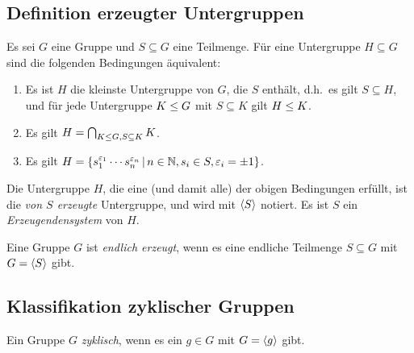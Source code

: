 \subsection{Definition erzeugter Untergruppen}

Es sei $G$ eine Gruppe und $S \subseteq G$ eine Teilmenge.
Für eine Untergruppe $H \subseteq G$ sind die folgenden Bedingungen äquivalent:

\begin{enumerate}
  \item
    Es ist $H$ die kleinste Untergruppe von $G$, die $S$ enthält, d.h.\ es gilt $S \subseteq H$, und für jede Untergruppe $K \mathrel{\leq} G$ mit $S \subseteq K$ gilt $H \mathrel{\leq} K$.
  \item
    Es gilt $H = \bigcap_{K \mathrel{\leq} G, S \subseteq K} K$.
  \item
    Es gilt
    $
        H
      = \{
          s_1^{\varepsilon_1} \dotsm s_n^{\varepsilon_n}
        \suchthat
          n \in \Natural,
          s_i \in S,
          \varepsilon_i = \pm 1
        \}
    $.
\end{enumerate}

\begin{definition}
  Die Untergruppe $H$, die eine \textup(und damit alle\textup) der obigen Bedingungen erfüllt, ist die \emph{von $S$ erzeugte} Untergruppe, und wird mit $\langle S\rangle$ notiert.
  Es ist $S$ ein \emph{Erzeugendensystem} von $H$.
\end{definition}

\begin{definition}
  Eine Gruppe $G$ ist \emph{endlich erzeugt}, wenn es eine endliche Teilmenge $S \subseteq G$ mit $G = \langle S\rangle$ gibt.
\end{definition}



\subsection{Klassifikation zyklischer Gruppen}

\begin{definition}
  Ein Gruppe $G$ \emph{zyklisch}, wenn es ein $g \in G$ mit $G = \langle g\rangle$ gibt.
\end{definition}

